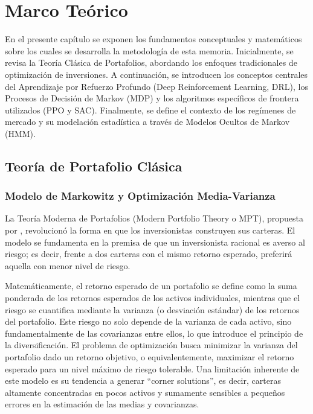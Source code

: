 \chapter{Marco Teórico}

En el presente capítulo se exponen los fundamentos conceptuales y matemáticos sobre los cuales se desarrolla la metodología de esta memoria. Inicialmente, se revisa la Teoría Clásica de Portafolios, abordando los enfoques tradicionales de optimización de inversiones. A continuación, se introducen los conceptos centrales del Aprendizaje por Refuerzo Profundo (Deep Reinforcement Learning, DRL), los Procesos de Decisión de Markov (MDP) y los algoritmos específicos de frontera utilizados (PPO y SAC). Finalmente, se define el contexto de los regímenes de mercado y su modelación estadística a través de Modelos Ocultos de Markov (HMM).

\section{Teoría de Portafolio Clásica}

\subsection{Modelo de Markowitz y Optimización Media-Varianza}
La Teoría Moderna de Portafolios (Modern Portfolio Theory o MPT), propuesta por \citet{markowitz1952portfolio}, revolucionó la forma en que los inversionistas construyen sus carteras. El modelo se fundamenta en la premisa de que un inversionista racional es averso al riesgo; es decir, frente a dos carteras con el mismo retorno esperado, preferirá aquella con menor nivel de riesgo. 

Matemáticamente, el retorno esperado de un portafolio se define como la suma ponderada de los retornos esperados de los activos individuales, mientras que el riesgo se cuantifica mediante la varianza (o desviación estándar) de los retornos del portafolio. Este riesgo no solo depende de la varianza de cada activo, sino fundamentalmente de las covarianzas entre ellos, lo que introduce el principio de la diversificación. El problema de optimización busca minimizar la varianza del portafolio dado un retorno objetivo, o equivalentemente, maximizar el retorno esperado para un nivel máximo de riesgo tolerable. Una limitación inherente de este modelo es su tendencia a generar ``corner solutions'', es decir, carteras altamente concentradas en pocos activos y sumamente sensibles a pequeños errores en la estimación de las medias y covarianzas.

